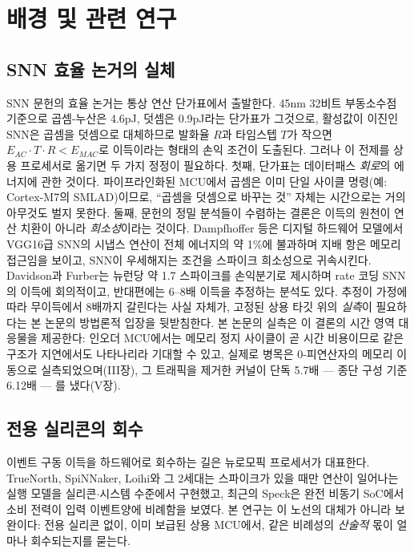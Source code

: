 \section{배경 및 관련 연구}\label{sec:related}

\subsection{SNN 효율 논거의 실체}\label{sec:premise}

SNN 문헌의 효율 논거는 통상 연산 단가표에서 출발한다. 45nm 32비트
부동소수점 기준으로 곱셈-누산은 4.6pJ, 덧셈은 0.9pJ라는
단가표\cite{horowitz2014computing}가 그것으로, 활성값이 이진인 SNN은
곱셈을 덧셈으로 대체하므로 발화율 $R$과 타임스텝 $T$가 작으면
$E_{AC}\!\cdot\!T\!\cdot\!R < E_{MAC}$로 이득이라는 형태의 손익
조건이 도출된다\cite{yao2023spikedriven}. 그러나 이 전제를 상용
프로세서로 옮기면 두 가지 정정이 필요하다. 첫째, 단가표는 데이터패스
\emph{회로}의 에너지에 관한 것이다. 파이프라인화된 MCU에서 곱셈은
이미 단일 사이클 명령(예: Cortex-M7의 SMLAD)이므로, ``곱셈을
덧셈으로 바꾸는 것'' 자체는 시간으로는 거의 아무것도 벌지 못한다.
둘째, 문헌의 정밀 분석들이 수렴하는 결론은 이득의 원천이 연산
치환이 아니라 \emph{희소성}이라는 것이다. Dampfhoffer 등은 디지털
하드웨어 모델에서 VGG16급 SNN의 시냅스 연산이 전체 에너지의 약
1\%에 불과하며 지배 항은 메모리 접근임을 보이고, SNN이 우세해지는
조건을 스파이크
희소성으로 귀속시킨다\cite{dampfhoffer2023snns}. Davidson과
Furber는 뉴런당 약 1.7 스파이크를 손익분기로 제시하며 rate 코딩
SNN의 이득에 회의적이고\cite{davidson2021comparison}, 반대편에는
6--8배 이득을 추정하는 분석도 있다\cite{lemaire2022analytical}.
추정이 가정에 따라 무이득에서 8배까지 갈린다는 사실 자체가, 고정된
상용 타깃 위의 \emph{실측}이 필요하다는 본 논문의 방법론적 입장을
뒷받침한다. 본 논문의 실측은 이 결론의 시간 영역 대응물을
제공한다: 인오더 MCU에서는 메모리 정지 사이클이 곧 시간 비용이므로
같은 구조가 지연에서도 나타나리라 기대할 수 있고, 실제로 병목은
0-피연산자의 메모리 이동으로 실측되었으며(III장), 그 트래픽을
제거한 커널이 단독 5.7배 --- 종단 구성 기준 6.12배 --- 를 냈다(V장).

\subsection{전용 실리콘의 회수}\label{sec:silicon}

이벤트 구동 이득을 하드웨어로 회수하는 길은 뉴로모픽 프로세서가
대표한다. TrueNorth\cite{merolla2014truenorth},
SpiNNaker\cite{furber2014spinnaker},
Loihi\cite{davies2018loihi}와 그 2세대\cite{orchard2021loihi2}는
스파이크가 있을 때만 연산이 일어나는 실행 모델을
실리콘$\cdot$시스템 수준에서 구현했고,
최근의 Speck은 완전 비동기 SoC에서 소비 전력이 입력 이벤트양에
비례함을 보였다\cite{yao2024speck}. 본 연구는 이 노선의 대체가
아니라 보완이다: 전용 실리콘 없이, 이미 보급된 상용 MCU에서, 같은
비례성의 \emph{산술적} 몫이 얼마나 회수되는지를 묻는다.


